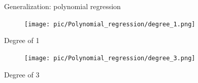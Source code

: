 \documentclass[serif, aspectratio=169]{beamer}
\begin{document}
    \begin{frame}{Generalization: polynomial regression}
        \begin{minipage}{0.45\textwidth}
            \centering
            \begin{figure}[h]
                \texttt{[image: pic/Polynomial\_regression/degree\_1.png]}
            \end{figure}
            \begin{center}
                Degree of 1
            \end{center}
        \end{minipage}%
        \begin{minipage}{0.45\textwidth}
            \centering
            \begin{figure}[h]
                \texttt{[image: pic/Polynomial\_regression/degree\_3.png]}
            \end{figure}
            \begin{center}
                Degree of 3
            \end{center}
        \end{minipage}
        \vfill
    \end{frame}
\end{document}
